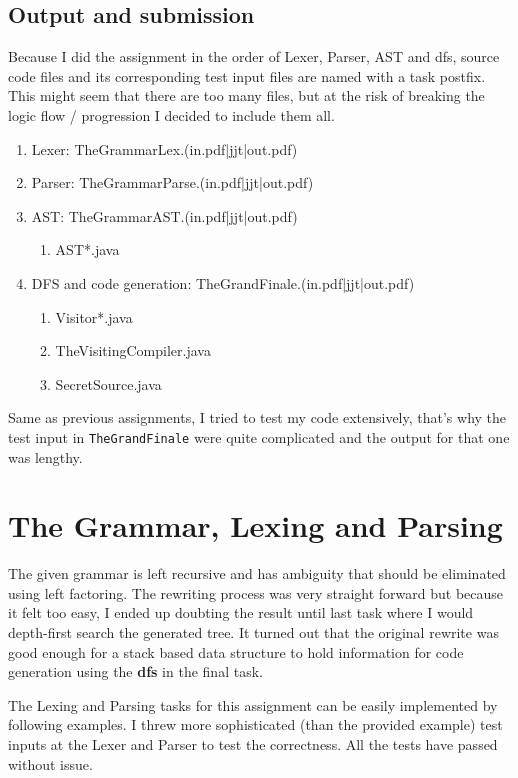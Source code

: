 \documentclass[11pt]{scrartcl}
\begin{document}
\subsection{Output and submission}
Because I did the assignment in the order of Lexer, Parser, AST and dfs, source code files and its corresponding test input files are named with a task postfix. This might seem that there are too many files, but at the risk of breaking the logic flow / progression I decided to include them all. 

\begin{enumerate}[ 1.]
	\item Lexer: TheGrammarLex.(in.pdf|jjt|out.pdf)
	\item Parser: TheGrammarParse.(in.pdf|jjt|out.pdf)
	\item AST: TheGrammarAST.(in.pdf|jjt|out.pdf) \begin{enumerate}
				\item AST*.java
				\end{enumerate}
	\item DFS and code generation: TheGrandFinale.(in.pdf|jjt|out.pdf) \begin{enumerate}
	\item Visitor*.java
	\item TheVisitingCompiler.java
	\item SecretSource.java
	\end{enumerate}
\end{enumerate}
Same as previous assignments, I tried to test my code extensively, that's why the test input in \texttt{TheGrandFinale} were quite complicated and the output for that one was lengthy.  
\section{The Grammar, Lexing and Parsing}

The given grammar is left recursive and has ambiguity that should be eliminated using left factoring. The rewriting process was very straight forward but because it felt too easy, I ended up doubting the result until last task where I would depth-first search the generated tree. It turned out that the original rewrite was good enough for a stack based data structure to hold information for code generation using the \textbf{dfs} in the final task.

The Lexing and Parsing tasks for this assignment can be easily implemented by following examples. I threw more sophisticated (than the provided example) test inputs at the Lexer and Parser to test the correctness. All the tests have passed without issue.
\end{document}
